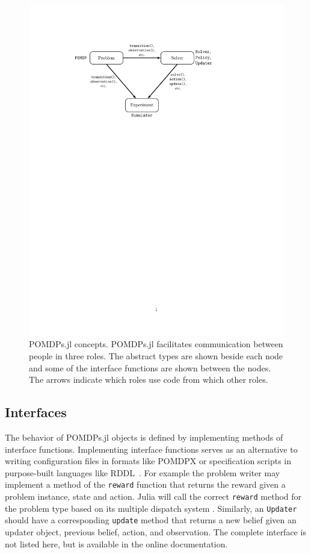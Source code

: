 \begin{figure}[htpb]
    \centering
    \includegraphics[width=0.8\linewidth]{media/arch.pdf}
    \caption[POMDPs.jl concepts]{POMDPs.jl concepts. POMDPs.jl facilitates communication between people in three roles. The abstract types are shown beside each node and some of the interface functions are shown between the nodes. The arrows indicate which roles use code from which other roles.}
    \label{fig:concepts}
\end{figure}

\subsection{Interfaces}

The behavior of POMDPs.jl objects is defined by implementing methods of interface functions.
Implementing interface functions serves as an alternative to writing configuration files in formats like POMDPX or specification scripts in purpose-built languages like RDDL~\cite{sanner2010rddl}.
For example the problem writer may implement a method of the \texttt{reward} function that returns the reward given a problem instance, state and action.
Julia will call the correct \texttt{reward} method for the problem type based on its multiple dispatch system \cite{bezanson2017julia}.
Similarly, an \texttt{Updater} should have a corresponding \texttt{update} method that returns a new belief given an updater object, previous belief, action, and observation.
The complete interface is not listed here, but is available in the online documentation.

